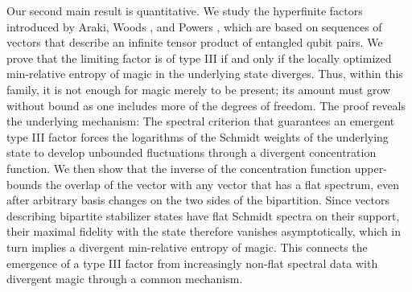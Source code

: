 \documentclass[aps,pra,reprint,superscriptaddress]{revtex4-2}
\theoremstyle{definition}
\theoremstyle{remark}
\begin{document}
Our second main result is quantitative. We study the hyperfinite factors introduced by Araki, Woods \cite{ArakiWoods1968}, and Powers \cite{Powers1967}, which are based on sequences of vectors that describe an infinite tensor product of entangled qubit pairs. We prove that the limiting factor is of type III if and only if the locally optimized min-relative entropy of magic in the underlying state diverges. Thus, within this family, it is not enough for magic merely to be present; its amount must grow without bound as one includes more of the degrees of freedom. The proof reveals the underlying mechanism: The spectral criterion that guarantees an emergent type III factor forces the logarithms of the Schmidt weights of the underlying state to develop unbounded fluctuations through a divergent concentration function. We then show that the inverse of the concentration function upper-bounds the overlap of the vector with any vector that has a flat spectrum, even after arbitrary basis changes on the two sides of the bipartition. Since vectors describing bipartite stabilizer states have flat Schmidt spectra on their support, their maximal fidelity with the state therefore vanishes asymptotically, which in turn implies a divergent min-relative entropy of magic. This connects the emergence of a type III factor from increasingly non-flat spectral data with divergent magic through a common mechanism.
\end{document}
